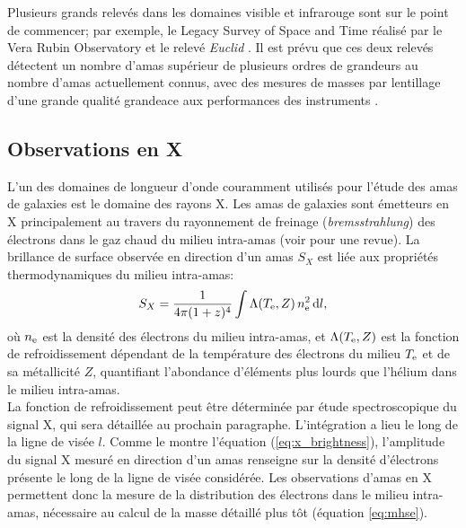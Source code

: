 Plusieurs grands relevés dans les domaines visible et infrarouge sont sur le point de commencer; par exemple, le Legacy Survey of Space and Time réalisé par le Vera Rubin Observatory \cite{lsst_science_collaboration_lsst_2009} et le relevé \textit{Euclid} \cite{amendola_cosmology_2013}.
Il est prévu que ces deux relevés détectent un nombre d'amas supérieur de plusieurs ordres de grandeurs au nombre d'amas actuellement connus, avec des mesures de masses par lentillage d'une grande qualité grandeace aux performances des instruments \cite{lsst_dark_energy_science_collaboration_large_2012,sartoris_next_2016}.

\subsection{Observations en X}\label{sec:x}

L'un des domaines de longueur d'onde couramment utilisés pour l'étude des amas de galaxies est le domaine des rayons X.
Les amas de galaxies sont émetteurs en X principalement au travers du rayonnement de freinage (\textit{bremsstrahlung}) des électrons dans le gaz chaud du milieu intra-amas (voir \cite{bohringer_x-ray_2013} pour une revue).
La brillance de surface observée en direction d'un amas $S_X$ est liée aux propriétés thermodynamiques du milieu intra-amas:
\begin{equation}
    \label{eq:x_brightness}
    S_X = \frac{1}{4\pi (1+z)^4} \int \Lambda(T_{\rm e}, Z) \, n_{\rm e}^2 \, \mathrm{d} l,
\end{equation}
où $n_{\rm e}$ est la densité des électrons du milieu intra-amas, et $\Lambda(T_{\rm e}, Z)$ est la fonction de refroidissement dépendant de la température des électrons du milieu $T_{\rm e}$ et de sa métallicité $Z$, quantifiant l'abondance d'éléments plus lourds que l'hélium dans le milieu intra-amas. \\
La fonction de refroidissement peut être déterminée par étude spectroscopique du signal X, qui sera détaillée au prochain paragraphe.
L'intégration a lieu le long de la ligne de visée $l$.
Comme le montre l'équation (\ref{eq:x_brightness}), l'amplitude du signal X mesuré en direction d'un amas renseigne sur la densité d'électrons présente le long de la ligne de visée considérée.
Les observations d'amas en X permettent donc la mesure de la distribution des électrons dans le milieu intra-amas, nécessaire au calcul de la masse détaillé plus tôt (équation \ref{eq:mhse}).

